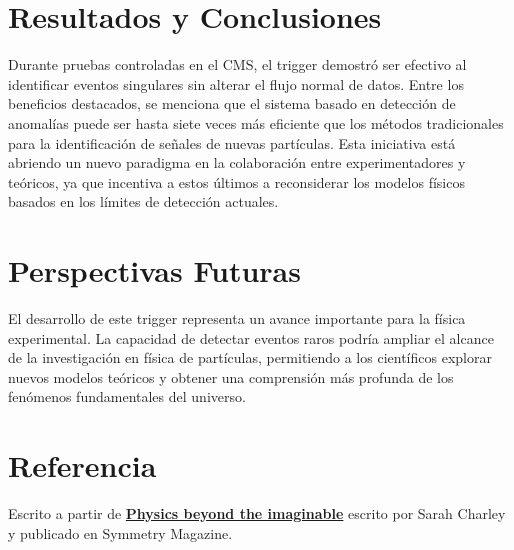 \documentclass[a4paper,12pt]{article}
\begin{document}
\section{Resultados y Conclusiones}
Durante pruebas controladas en el CMS, el trigger demostró ser efectivo al identificar eventos singulares sin alterar el flujo normal de datos. Entre los beneficios destacados, se menciona que el sistema basado en detección de anomalías puede ser hasta siete veces más eficiente que los métodos tradicionales para la identificación de señales de nuevas partículas. Esta iniciativa está abriendo un nuevo paradigma en la colaboración entre experimentadores y teóricos, ya que incentiva a estos últimos a reconsiderar los modelos físicos basados en los límites de detección actuales.

\section{Perspectivas Futuras}
El desarrollo de este trigger representa un avance importante para la física experimental. La capacidad de detectar eventos raros podría ampliar el alcance de la investigación en física de partículas, permitiendo a los científicos explorar nuevos modelos teóricos y obtener una comprensión más profunda de los fenómenos fundamentales del universo.

\section{Referencia}
Escrito a partir de \href{https://www.symmetrymagazine.org/article/physics-beyond-the-imaginable?language_content_entity=und}{\textbf{Physics beyond the imaginable}} escrito por Sarah Charley y publicado en Symmetry Magazine.
\end{document}
